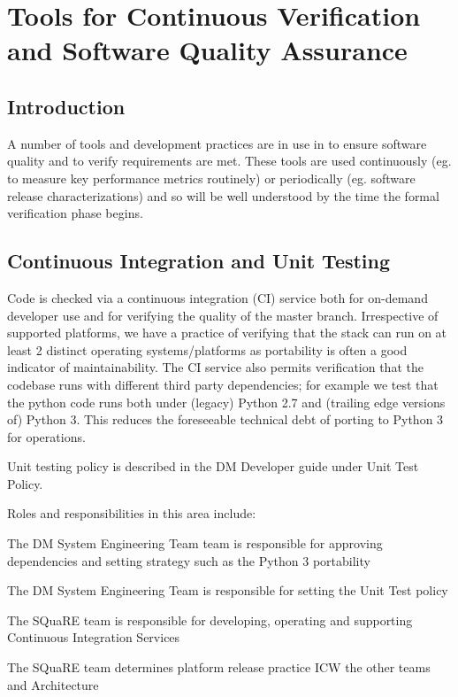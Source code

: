 \section{Tools for Continuous Verification and Software Quality Assurance}

\subsection{Introduction}

A number of tools and development practices are in use in \product to ensure software quality and to verify requirements are met. These tools are used continuously (eg. to measure key performance metrics routinely) or periodically (eg. software release characterizations) and so will be well understood by the time the formal verification phase begins. 

\subsection{Continuous Integration and Unit Testing}
 
Code is checked via a continuous integration (CI) service both for on-demand developer use and for verifying the quality of the master branch. Irrespective of supported platforms, we have a practice of verifying that the stack can run on at least 2 distinct operating systems/platforms as portability is often a good indicator of maintainability. The CI service also permits verification that the codebase runs with different third party dependencies; for example we test that the python code runs both under (legacy) Python 2.7 and (trailing edge versions of) Python 3. This reduces the foreseeable technical debt of porting to Python 3 for operations.
 
Unit testing policy is described in the DM Developer guide under Unit Test Policy.
 
Roles and responsibilities in this area include:

\begin{itemize_single}
  
\item The DM System Engineering Team  team is responsible for approving dependencies and setting strategy such as the Python 3 portability

\item The DM System Engineering  Team is responsible for setting the Unit Test policy

\item The SQuaRE team is responsible for developing, operating and supporting Continuous Integration Services

\item The SQuaRE team determines platform release practice ICW the other teams and Architecture
  
\end{itemize_single}

